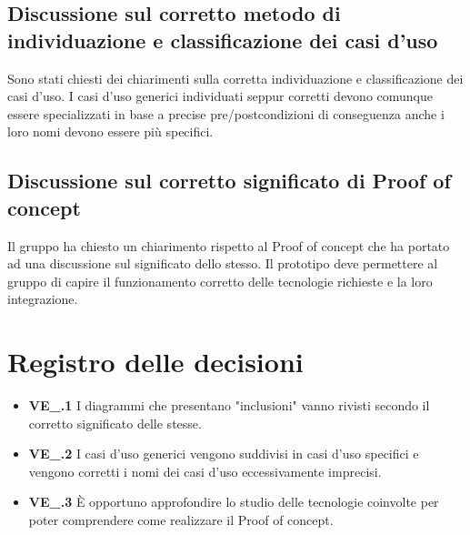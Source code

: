 \subsection{Discussione sul corretto metodo di individuazione e classificazione dei casi d'uso}
Sono stati chiesti dei chiarimenti sulla corretta individuazione e classificazione dei casi d'uso. I casi d'uso generici individuati seppur corretti devono comunque essere specializzati in base a precise pre/postcondizioni di conseguenza anche i loro nomi devono essere più specifici.
\subsection{Discussione sul corretto significato di Proof of concept}
Il gruppo ha chiesto un chiarimento rispetto al Proof of concept che ha portato ad una discussione sul significato dello stesso. Il prototipo deve permettere al gruppo di capire il funzionamento corretto delle tecnologie richieste e la loro integrazione.

\section{Registro delle decisioni}
\begin{itemize}
  \item \textbf{VE\_\Data.1} I diagrammi che presentano "inclusioni" vanno rivisti secondo il corretto significato delle stesse.
   \item \textbf{VE\_\Data.2} I casi d'uso generici vengono suddivisi in casi d'uso specifici e vengono corretti i nomi dei casi d'uso eccessivamente imprecisi.
   \item \textbf{VE\_\Data.3} È opportuno approfondire lo studio delle tecnologie coinvolte per poter comprendere come realizzare il Proof of concept.
\end{itemize}